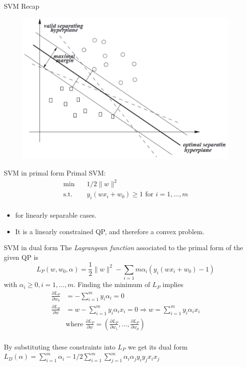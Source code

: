 \documentclass[notes]{beamer}
\begin{document}
\begin{frame}
	{SVM Recap} 
	\begin{figure}
		\includegraphics[width=.75\textwidth]{2018-03-05-10-14-45.png} 
		\end{figure}
	
\end{frame}

\begin{frame}
	{SVM in primal form} 
	Primal SVM:
	\begin{equation*}
		\begin{aligned}
			\min \quad & 1/2 \|w\|^2\\
			\mathrm{s.t.} \quad  & y_i(wx_i+w_0)\ge 1 \text{ for } i=1,...,m\\ 
		\end{aligned}
	\end{equation*}
	\begin{itemize}
		\item for linearly separable cases. 
		\item It is a linearly constrained QP, and therefore a convex problem.
	\end{itemize}
\end{frame}
\begin{frame}
	{SVM in dual form} 
	The \emph{Lagrangean function} associated to the primal form of the given QP is \[
		L_P(w,w_0,\alpha)=\frac{1}{2}\|w\|^2 - \sum_{i=1}{m} \alpha_i(y_i(wx_i+w_0)-1)
	\]
	with $\alpha_i\ge 0, i =1,...,m$. Finding the minimum of $L_P$ implies
	\begin{equation*}
		\begin{aligned}
			\frac{\partial L_P}{\partial w_0}&=-\sum_{i=1}^{m}y_i\alpha_i=0  \\ 
			\frac{\partial L_P}{\partial w}&=w-\sum_{i=1}^{m}y_i \alpha_i x_i=0 \Rightarrow w=\sum_{i=1}^{m}y_i \alpha_i x_i  \\ 
			\quad & \text{where } \frac{\partial L_P}{\partial w}=(\frac{\partial L_P}{\partial w_1}, ..., \frac{\partial L_P}{\partial w_d}) \\
		\end{aligned}
	\end{equation*}
	
	By substituting these constraints into $L_P$ we get its dual form
	$L_D(\alpha) = \sum_{i=1}^{m} \alpha_i - 1/2 \sum_{i=1}^{m} \sum_{j=1}^{m} \alpha_i \alpha_j y_i y_j x_i x_j$

\end{frame}
\end{document}

